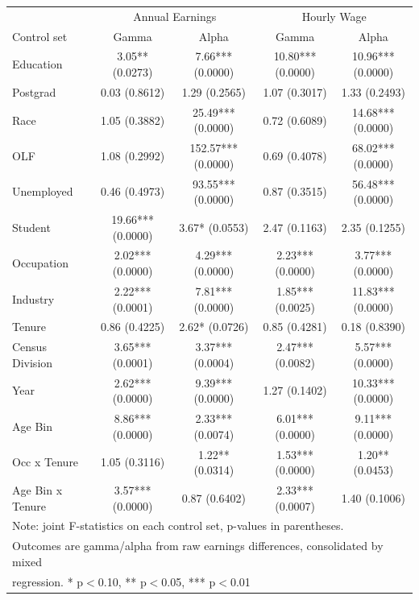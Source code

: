 \begin{tabular}{lcc|cc}
\hline\hline
 & \multicolumn{2}{c|}{Annual Earnings} & \multicolumn{2}{c}{Hourly Wage} \\
Control set & Gamma & Alpha & Gamma & Alpha \\
\hline
Education&3.05** (0.0273)&7.66*** (0.0000)&10.80*** (0.0000)&10.96*** (0.0000)\\
Postgrad&0.03 (0.8612)&1.29 (0.2565)&1.07 (0.3017)&1.33 (0.2493)\\
Race&1.05 (0.3882)&25.49*** (0.0000)&0.72 (0.6089)&14.68*** (0.0000)\\
OLF&1.08 (0.2992)&152.57*** (0.0000)&0.69 (0.4078)&68.02*** (0.0000)\\
Unemployed&0.46 (0.4973)&93.55*** (0.0000)&0.87 (0.3515)&56.48*** (0.0000)\\
Student&19.66*** (0.0000)&3.67* (0.0553)&2.47 (0.1163)&2.35 (0.1255)\\
Occupation&2.02*** (0.0000)&4.29*** (0.0000)&2.23*** (0.0000)&3.77*** (0.0000)\\
Industry&2.22*** (0.0001)&7.81*** (0.0000)&1.85*** (0.0025)&11.83*** (0.0000)\\
Tenure&0.86 (0.4225)&2.62* (0.0726)&0.85 (0.4281)&0.18 (0.8390)\\
Census Division&3.65*** (0.0001)&3.37*** (0.0004)&2.47*** (0.0082)&5.57*** (0.0000)\\
Year&2.62*** (0.0000)&9.39*** (0.0000)&1.27 (0.1402)&10.33*** (0.0000)\\
Age Bin&8.86*** (0.0000)&2.33*** (0.0074)&6.01*** (0.0000)&9.11*** (0.0000)\\
Occ x Tenure&1.05 (0.3116)&1.22** (0.0314)&1.53*** (0.0000)&1.20** (0.0453)\\
Age Bin x Tenure&3.57*** (0.0000)&0.87 (0.6402)&2.33*** (0.0007)&1.40 (0.1006)\\
\hline
\multicolumn{5}{l}{\footnotesize Note: joint F-statistics on each control set, p-values in parentheses.} \\
\multicolumn{5}{l}{\footnotesize Outcomes are gamma/alpha from raw earnings differences, consolidated by mixed} \\
\multicolumn{5}{l}{\footnotesize regression. * p$<$0.10, ** p$<$0.05, *** p$<$0.01} \\
\hline\hline
\end{tabular}
